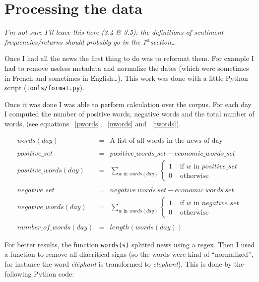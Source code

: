 \documentclass[12pt]{report}
\newcommand{\superscript}[1]{\ensuremath{^{\textrm{#1}}}}
\newcommand{\st}[0]{\superscript{st}}
\begin{document}
		\section{Processing the data}

			\emph{\color{red}I'm not sure I'll leave this here (3.4 \& 3.5): the definitions of sentiment frequencies/returns should probably go in the 1\st section\ldots}

			Once I had all the news the first thing to do was to reformat them. For example I had to remove useless metadata and normalize the dates (which were sometimes in French and sometimes in English\ldots). This work was done with a little Python script (\lstinline!tools/format.py!).

			Once it was done I was able to perform calculation over the corpus. For each day I computed the number of positive words, negative words and the total number of words, (see equations ~\ref{pwords}, ~\ref{nwords} and ~\ref{twords}).

			\begin{eqnarray}
			words(day) &=& \textrm{A list of all words in the news of day}\nonumber\\
			\nonumber\\
			positive\_set &=& positive\_words\_set - economic\_words\_set\nonumber\\
			positive\_words(day) &=& \sum_{w \textrm{ in } words(day)} \begin{cases}1 & \textrm{ if }w \textrm{ in } positive\_set\\ 0 & \mbox{ otherwise }\end{cases}\label{pwords}\\
			\nonumber\\
			negative\_set &=& negative\ words\ set - economic\ words\ set\nonumber\\
			negative\_words(day) &=& \sum_{w \textrm{ in } words(day)} \begin{cases}1 & \textrm{ if }w \textrm{ in } negative\_set\\ 0 & \mbox{ otherwise }\end{cases}\label{nwords}\\
			\nonumber\\
			number\_of\_words(day) &=& length(words(day))\label{twords}
			\end{eqnarray}

			For better results, the function \lstinline!words(s)! splitted news using a regex. Then I used a function to remove all diacritical signs (so the words were kind of ``normalized'', for instance the word \emph{éléphant} is transformed to \emph{elephant}). This is done by the following Python code:
\end{document}
